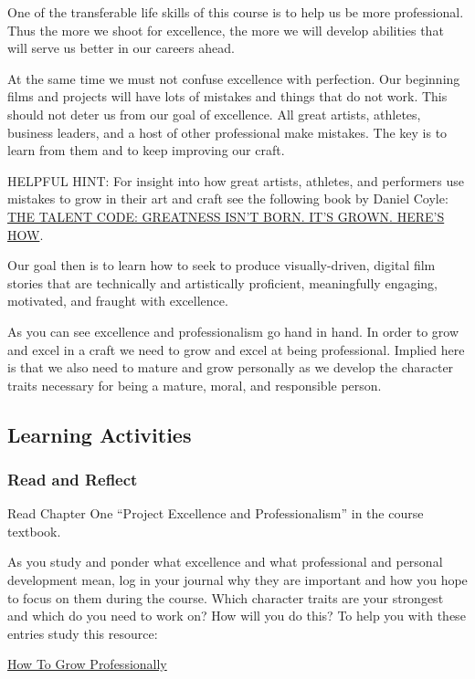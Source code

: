 \documentclass[
]{book}
\begin{document}
One of the transferable life skills of this course is to help us be more professional. Thus the more we shoot for excellence, the more we will develop abilities that will serve us better in our careers ahead.

At the same time we must not confuse excellence with perfection. Our beginning films and projects will have lots of mistakes and things that do not work. This should not deter us from our goal of excellence. All great artists, athletes, business leaders, and a host of other professional make mistakes. The key is to learn from them and to keep improving our craft.

HELPFUL HINT: For insight into how great artists, athletes, and performers use mistakes to grow in their art and craft see the following book by Daniel Coyle: \href{http://danielcoyle.com/the-talent-code/}{THE TALENT CODE: GREATNESS ISN'T BORN. IT'S GROWN. HERE'S HOW}.

Our goal then is to learn how to seek to produce visually-driven, digital film stories that are technically and artistically proficient, meaningfully engaging, motivated, and fraught with excellence.

As you can see excellence and professionalism go hand in hand. In order to grow and excel in a craft we need to grow and excel at being professional. Implied here is that we also need to mature and grow personally as we develop the character traits necessary for being a mature, moral, and responsible person.

\hypertarget{learning-activities-1}{%
\subsection*{Learning Activities}\label{learning-activities-1}}

\begin{reflect}
\hypertarget{read-and-reflect}{%
\subsubsection*{Read and Reflect}\label{read-and-reflect}}

Read Chapter One ``Project Excellence and Professionalism'' in the course textbook.

As you study and ponder what excellence and what professional and personal development mean, log in your journal why they are important and how you hope to focus on them during the course. Which character traits are your strongest and which do you need to work on? How will you do this? To help you with these entries study this resource:

\href{https://brandyourself.com/blog/guide/how-to-grow-professionally/}{How To Grow Professionally}
\end{reflect}
\end{document}
